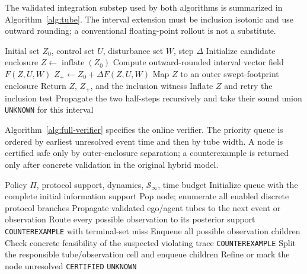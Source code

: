 \documentclass[letterpaper]{article} %
\begin{document}
The validated integration substep used by both algorithms is summarized
in Algorithm~\ref{alg:tube}. The interval extension must be inclusion isotonic
and use outward rounding; a conventional floating-point rollout is not a
substitute.
\begin{algorithm}[t]
\footnotesize
\caption{Validated continuous-time tube propagation}
\label{alg:tube}
\begin{algorithmic}[1]
\Require Initial set $Z_0$, control set $U$, disturbance set $W$, step $\Delta$
\State Initialize candidate enclosure $Z\gets\operatorname{inflate}(Z_0)$
\Repeat
  \State Compute outward-rounded interval vector field $F(Z,U,W)$
    \State $Z_+\gets Z_0+\Delta F(Z,U,W)$
    \State Map $Z$ to an outer swept-footprint enclosure
    \State Return $Z$, $Z_+$, and the inclusion witness
  \Else
    \State Inflate $Z$ and retry the inclusion test
  \EndIf
{}
  \State Propagate the two half-steps recursively and take their sound union
\Else
  \State \Return \texttt{UNKNOWN} for this interval
\EndIf
\end{algorithmic}
\end{algorithm}

Algorithm~\ref{alg:full-verifier} specifies the online verifier. The priority
queue is ordered by earliest unresolved event time and then by tube width.
A node is certified safe only by outer-enclosure separation; a counterexample
is returned only after concrete validation in the original hybrid model.
\begin{algorithm}[!ht]
\scriptsize
\caption{Full-support tube verification with CEGAR}
\label{alg:full-verifier}
\begin{algorithmic}[1]
\Require Policy $\Pi$, protocol support, dynamics, $\mathcal S_\infty$, time budget
\State Initialize queue with the complete initial information support
  \State Pop node; enumerate all enabled discrete protocol branches
  \State Propagate validated ego/agent tubes to the next event or observation
    \State Route every possible observation to its posterior support
        \State \Return \texttt{COUNTEREXAMPLE} with terminal-set miss
      \EndIf
    \Else
      \State Enqueue all possible observation children
    \EndIf
  \Else
    \State Check concrete feasibility of the suspected violating trace
     \State \Return \texttt{COUNTEREXAMPLE}
      \State Split the responsible tube/observation cell and enqueue children
    \Else \State Refine or mark the node unresolved \EndIf
  \EndIf
\EndWhile
{} \State \Return \texttt{CERTIFIED}
\Else \State \Return \texttt{UNKNOWN} \EndIf
\end{algorithmic}
\end{algorithm}
\end{document}
